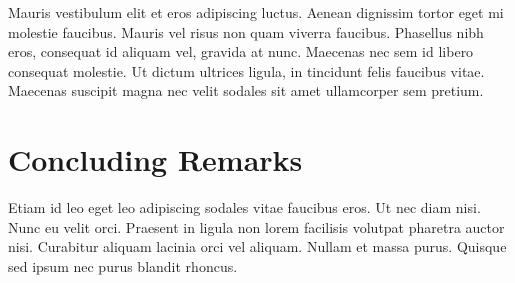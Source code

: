 \documentclass[letterpaper]{article}
\begin{document}
Mauris vestibulum elit et eros adipiscing luctus. Aenean dignissim
tortor eget mi molestie faucibus. Mauris vel risus non quam viverra
faucibus. Phasellus nibh eros, consequat id aliquam vel, gravida at
nunc. Maecenas nec sem id libero consequat molestie. Ut dictum
ultrices ligula, in tincidunt felis faucibus vitae. Maecenas suscipit
magna nec velit sodales sit amet ullamcorper sem pretium.

\section*{Concluding Remarks}
Etiam id leo eget leo adipiscing sodales vitae faucibus eros. Ut nec
diam nisi. Nunc eu velit orci. Praesent in ligula non lorem facilisis
volutpat pharetra auctor nisi. Curabitur aliquam lacinia orci vel
aliquam. Nullam et massa purus. Quisque sed ipsum nec purus blandit
rhoncus.
\end{document}
